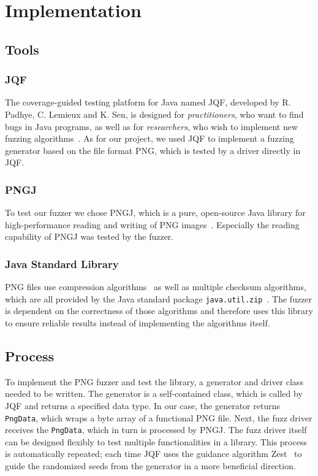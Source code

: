 \documentclass[runningheads]{llncs}
\begin{document}
\section{Implementation}
\subsection{Tools}
\subsubsection{JQF}
The coverage-guided testing platform for Java named JQF, developed by R. Padhye, C. Lemieux and K. Sen, is designed for \textit{practitioners}, who want to find bugs in Java programs, as well as for \textit{researchers}, who wish to implement new fuzzing algorithms~\cite{JQF_paper}. As for our project, we used JQF to implement a fuzzing generator based on the file format PNG, which is tested by a driver directly in JQF.
\subsubsection{PNGJ}
To test our fuzzer we chose PNGJ, which is a pure, open-source Java library for high-performance reading and writing of PNG images~\cite{PNGJ_github}. Especially the reading capability of PNGJ was tested by the fuzzer.
\subsubsection{Java Standard Library}
PNG files use compression algorithms~\cite{rfc_deflate_compression} as well as multiple checksum algorithms, which are all provided by the Java standard package \texttt{java.util.zip}~\cite{java_util_zip_docs}. The fuzzer is dependent on the correctness of those algorithms and therefore uses this library to ensure reliable results instead of implementing the algorithms itself.
\subsection{Process}
To implement the PNG fuzzer and test the library, a generator and driver class needed to be written. The generator is a self-contained class, which is called by JQF and returns a specified data type. In our case, the generator returns \texttt{PngData}, which wraps a byte array of a functional PNG file. Next, the fuzz driver receives the \texttt{PngData}, which in turn is processed by PNGJ. The fuzz driver itself can be designed flexibly to test multiple functionalities in a library. This process is automatically repeated; each time JQF uses the guidance algorithm Zest~\cite{zest_guidance} to guide the randomized seeds from the generator in a more beneficial direction.
\end{document}
